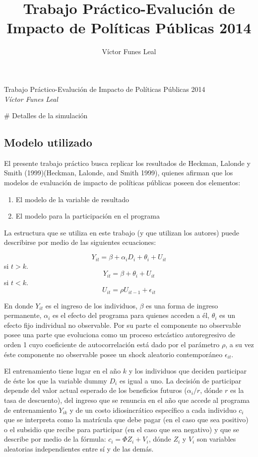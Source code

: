 \documentclass[]{article}
\title{Trabajo Práctico-Evalución de Impacto de Políticas Públicas 2014}
\author{Víctor Funes Leal}
\date{}
\begin{document}
\begin{center}
\huge Trabajo Práctico-Evalución de Impacto de Políticas Públicas 2014 \\[0.2cm]
\large \emph{Víctor Funes Leal}\\[0.1cm]
\normalsize
\end{center}


{
\hypersetup{linkcolor=black}
\setcounter{tocdepth}{2}
\tableofcontents
}
\newpage
\# Detalles de la simulación

\subsection{Modelo utilizado}\label{modelo-utilizado}

El presente trabajo práctico busca replicar los resultados de Heckman,
Lalonde y Smith (1999)(Heckman, Lalonde, and Smith 1999), quienes
afirman que los modelos de evaluación de impacto de políticas públicas
poseen dos elementos:

\begin{enumerate}
\def\labelenumi{\arabic{enumi}.}
\itemsep1pt\parskip0pt
\item
  El modelo de la variable de resultado
\item
  El modelo para la participación en el programa
\end{enumerate}

La estructura que se utiliza en este trabajo (y que utilizan los
autores) puede describirse por medio de las siguientes ecuaciones:

\[ Y_{it}=\beta+\alpha_{i}D_{i}+\theta_{i}+U_{it} \] si $t>k$.
\[ Y_{it}=\beta+\theta_{i}+U_{it} \] si $t<k$.
\[ U_{it}=\rho U_{it-1}+\epsilon_{it}\]

En donde $Y_{it}$ es el ingreso de los individuos, $\beta$ es una forma
de ingreso permanente, $\alpha_{i}$ es el efecto del programa para
quienes acceden a él, $\theta_{i}$ es un efecto fijo individual no
observable. Por su parte el componente no observable posee una parte que
evoluciona como un proceso estcástico autoregresivo de orden 1 cuyo
coeficiente de autocorrelación está dado por el parámetro $\rho$, a su
vez éste componente no observable posee un shock aleatorio contemporáneo
$\epsilon_{it}$.

El entrenamiento tiene lugar en el año $k$ y los individuos que deciden
participar de éste los que la variable dummy $D_{i}$ es igual a uno. La
decisión de participar depende del valor actual esperado de los
beneficios futuros ($\alpha_{i}/r$, dónde $r$ es la tasa de descuento),
del ingreso que se renuncia en el año que accede al programa de
entrenamiento $Y_{ik}$ y de un costo idiosincrático específico a cada
individuo $c_{i}$ que se interpreta como la matrícula que debe pagar (en
el caso que sea positivo) o el subsidio que recibe para participar (en
el caso que sea negativo) y que se describe por medio de la fórmula:
$c_{i}=\Phi Z_{i}+V_{i}$, dónde $Z_{i}$ y $V_{i}$ son variables
aleatorias independientes entre sí y de las demás.
\end{document}
